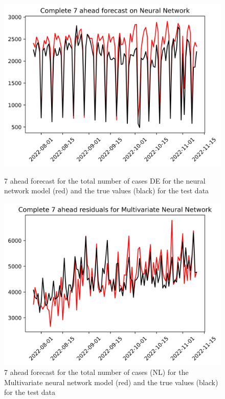 \begin{figure}

\begin{minipage}{.32\textwidth}
  \centering
  \includegraphics[width=\linewidth]{pics/7_ah/DE_Complete_7_ahead_Neural Network.png}
  \caption{7 ahead forecast for the total number of cases DE for the neural network model (red) and the true values (black) for the test data}
  \label{fig:tot_cases_fc_7_nn_DE}
\end{minipage}
\begin{minipage}{.32\textwidth}
  \centering
  \includegraphics[width=\linewidth]{pics/7_ah/Complete_7_ahead_Multivariate Neural Network.png}
  \caption{7 ahead forecast for the total number of cases (NL) for the Multivariate neural network model (red) and the true values (black) for the test data}

\end{minipage}
\end{figure}
